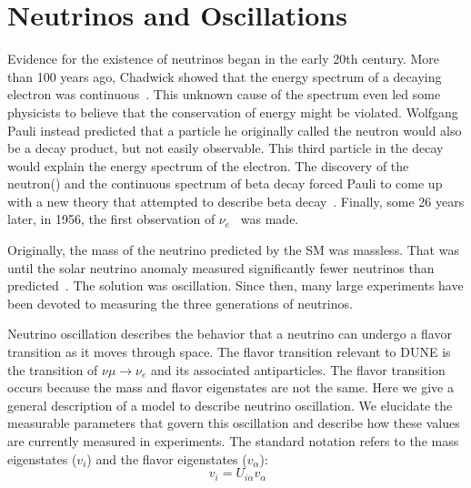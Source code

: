 \section{Neutrinos and Oscillations}
\label{sec:neutrino_oscillation}
Evidence for the existence of neutrinos began in the early 20th century.
More than 100 years ago, Chadwick showed that the energy spectrum of a decaying electron was continuous~\citep{Chadwick:1914zz}.
This unknown cause of the spectrum even led some physicists to believe that the conservation of energy might be violated.
Wolfgang Pauli instead predicted that a particle he originally called the neutron would also be a decay product, but not easily observable.
This third particle in the decay would explain the energy spectrum of the electron.
The discovery of the neutron(\citep{Chadwick1932PossibleEO}) and the continuous spectrum of beta decay forced Pauli to come up with a new theory that attempted to describe beta decay~\citep{pauli_1934}.
Finally, some 26 years later, in 1956, the first observation of $\nu_{e}$~\citep{first_neutrino_measurement} was made.

Originally, the mass of the neutrino predicted by the SM was massless.
That was until the solar neutrino anomaly measured significantly fewer neutrinos than predicted~\citep{solar_neutrino_problem_PhysRevLett.20.1205}.
The solution was oscillation.
Since then, many large experiments have been devoted to measuring the three generations of neutrinos.
~\citep{SNO_2002_neutrino_PhysRevLett.89.011301,
neutrino_measurement_NOvA_2019_prl,
t2k_2011_neutrino_PhysRevLett.107.041801,
reno_2012_neutrino_PhysRevLett.108.191802,
FUKUDA2002_solar_neutrino_oscillation,
kamland_2003_neutrino_PhysRevLett.90.021802,
daya_bay_2012_neutrino_PhysRevLett.108.171803,
PhysRevD.91.072010_t2k_2015,
doubleChooz_2012_neutrino_PhysRevLett.108.131801}

Neutrino oscillation describes the behavior that a neutrino can undergo a flavor transition as it moves through space.
The flavor transition relevant to DUNE is the transition of $\nu{\mu}\rightarrow \nu_{e}$ and its associated antiparticles. 
The flavor transition occurs because the mass and flavor eigenstates are not the same.
Here we give a general description of a model to describe neutrino oscillation.
We elucidate the measurable parameters that govern this oscillation and describe how these values are currently measured in experiments.
The standard notation refers to the mass eigenstates ($v_{i}$) and the flavor eigenstates ($v_{\alpha}$):
\begin{equation}~\label{eq:relate_eigenstates}
  v_{i} = U_{i\alpha}v_{\alpha}
\end{equation}

